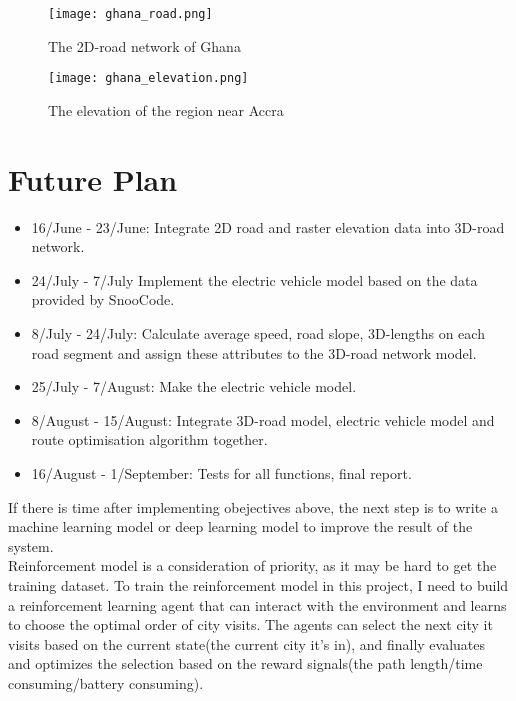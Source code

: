 \documentclass[project-plan]{report-template}
\begin{document}
\begin{figure*}[htbp]
    \centering
    \begin{minipage}[t]{0.48\textwidth}
    \centering
    \texttt{[image: ghana\_road.png]}
    \caption{\label{fig:ghana_road} The 2D-road network of Ghana}
    \end{minipage}
    \begin{minipage}[t]{0.48\textwidth}
    \centering
    \texttt{[image: ghana\_elevation.png]}
    \caption{\label{fig:ghana_elevation} The elevation of the region near Accra}
    \end{minipage}
\end{figure*}

\section {Future Plan}
\begin{itemize}
    \item 16/June - 23/June: Integrate 2D road and raster elevation data into 3D-road network.
    \item 24/July - 7/July Implement the electric vehicle model based on the data provided by SnooCode.
    \item 8/July - 24/July: Calculate average speed, road slope, 3D-lengths on each road segment and assign these attributes to the 3D-road network model.
    \item 25/July - 7/August: Make the electric vehicle model.
    \item 8/August - 15/August: Integrate 3D-road model, electric vehicle model and route optimisation algorithm together.
    \item 16/August - 1/September: Tests for all functions, final report.
\end{itemize}

If there is time after implementing obejectives above, the next step is to write a machine learning model or deep learning model
to improve the result of the system. \\

Reinforcement model is a consideration of priority, as it may be hard to get the training dataset.
To train the reinforcement model in this project, I need to build a reinforcement learning agent that can
interact with the environment and learns to choose the optimal order of city visits. 
The agents can select the next city it visits based on the current state(the current city it's in), 
and finally evaluates and optimizes the selection based on the reward signals(the path length/time consuming/battery consuming).



\end{document}
